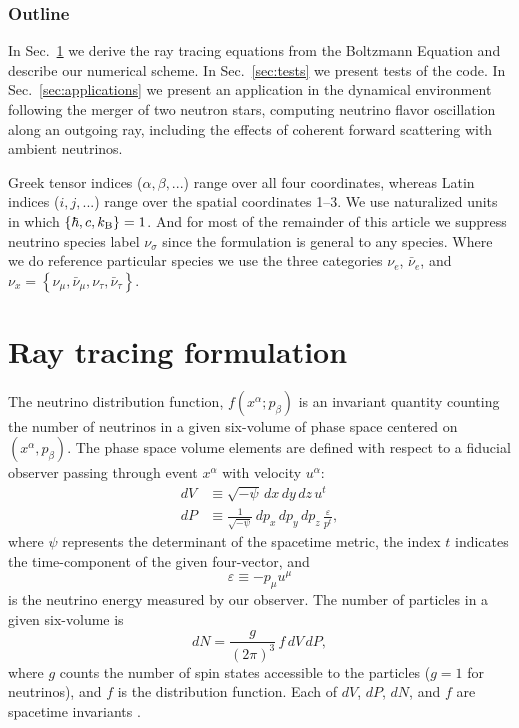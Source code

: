 \documentclass[aps,floatfix,prd,superscriptaddress,twocolumn]{revtex4-1}
\begin{document}
\subsubsection*{Outline}
In Sec.~\ref{sec:formulation} we derive the ray tracing equations from the
Boltzmann Equation and describe our numerical scheme.
In Sec.~\ref{sec:tests} we present tests of the code.
In Sec.~\ref{sec:applications} we present an application
in the dynamical environment following the merger of two neutron stars,
computing neutrino flavor oscillation along an outgoing ray,
including the effects of coherent forward scattering with ambient neutrinos.

Greek tensor indices ($\alpha, \beta, ...$) range over all four coordinates,
whereas Latin indices ($i, j, ...$) range over the spatial coordinates 1--3.
We use naturalized units in which $\{\hbar,c,k_{\rm B}\}=1$.
And for most of the remainder of this article we suppress neutrino species label
$\nu_\sigma$ since the formulation is general to any species.
Where we do reference particular species we use the three categories
$\nu_e$, $\bar{\nu}_e$, and
$\nu_x=\left\{\nu_\mu,\bar{\nu}_\mu,\nu_\tau,\bar{\nu}_\tau\right\}$.

\section{Ray tracing formulation}
\label{sec:formulation}
The neutrino distribution function, $f(x^\alpha; p_\beta)$ is an invariant
quantity counting the number of neutrinos in a given six-volume of phase
space centered on $(x^\alpha,p_\beta)$.
The phase space volume elements are defined with respect to a fiducial
observer passing through event $x^\alpha$ with velocity $u^\alpha$:
\begin{align}
  \label{eqn:dV}
  dV & \equiv \sqrt{-\psi} \, dx \, dy \, dz \, u^t \\
  \label{eqn:dP}
  dP & \equiv \frac{1}{\sqrt{-\psi}} \, dp_x \, dp_y \, dp_z \,
  \frac{\varepsilon}{p^t},
\end{align}
where $\psi$ represents the determinant of the spacetime metric,
the index $t$ indicates the time-component of the given four-vector, and
\begin{equation}
  \label{eqn:varepsilon}
  \varepsilon \equiv -p_\mu u^\mu
\end{equation}
is the neutrino energy measured by our observer.
The number of particles in a given six-volume is
\begin{equation}
  dN=\frac{g}{(2\pi)^3}\,f\,dV\,dP,
\end{equation}
where $g$ counts the number of spin states accessible to the
particles ($g=1$ for neutrinos), and $f$ is the distribution function.
Each of $dV$, $dP$, $dN$, and $f$ are spacetime invariants
\citep{debb2009-gr_boltzmann_1, debb2009-gr_boltzmann_2, lind1966-gr_boltzmann}.
\end{document}
